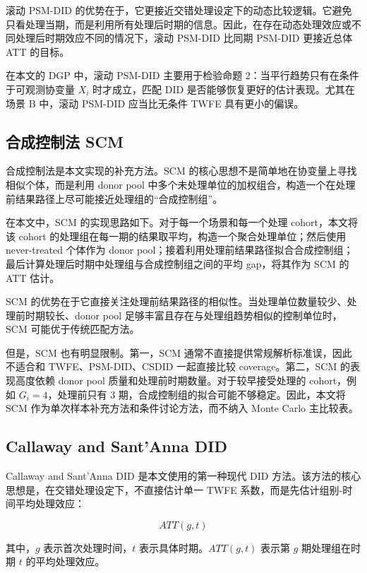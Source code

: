 \documentclass[
  fontset=windows]{ctexart}
\begin{document}
滚动 PSM-DID
的优势在于，它更接近交错处理设定下的动态比较逻辑。它避免只看处理当期，而是利用所有处理后时期的信息。因此，在存在动态处理效应或不同处理后时期效应不同的情况下，滚动
PSM-DID 比同期 PSM-DID 更接近总体 ATT 的目标。

在本文的 DGP 中，滚动 PSM-DID 主要用于检验命题
2：当平行趋势只有在条件于可观测协变量 \(X_i\) 时才成立，匹配 DID
是否能够恢复更好的估计表现。尤其在场景 B 中，滚动 PSM-DID 应当比无条件
TWFE 具有更小的偏误。

\subsection{合成控制法 SCM}\label{ux5408ux6210ux63a7ux5236ux6cd5-scm}

合成控制法是本文实现的补充方法。SCM
的核心思想不是简单地在协变量上寻找相似个体，而是利用 donor pool
中多个未处理单位的加权组合，构造一个在处理前结果路径上尽可能接近处理组的``合成控制组''。

在本文中，SCM 的实现思路如下。对于每一个场景和每一个处理
cohort，本文将该 cohort
的处理组在每一期的结果取平均，构造一个聚合处理单位；然后使用
never-treated 个体作为 donor
pool；接着利用处理前结果路径拟合合成控制组；最后计算处理后时期中处理组与合成控制组之间的平均
gap，将其作为 SCM 的 ATT 估计。

SCM
的优势在于它直接关注处理前结果路径的相似性。当处理单位数量较少、处理前时期较长、donor
pool 足够丰富且存在与处理组趋势相似的控制单位时，SCM
可能优于传统匹配方法。

但是，SCM 也有明显限制。第一，SCM
通常不直接提供常规解析标准误，因此不适合和 TWFE、PSM-DID、CSDID
一起直接比较 coverage。第二，SCM 的表现高度依赖 donor pool
质量和处理前时期数量。对于较早接受处理的 cohort，例如
\(G_i=4\)，处理前只有 3 期，合成控制组的拟合可能不够稳定。因此，本文将
SCM 作为单次样本补充方法和条件讨论方法，而不纳入 Monte Carlo 主比较表。

\subsection{Callaway and Sant'Anna DID}\label{callaway-and-santanna-did}

Callaway and Sant'Anna DID 是本文使用的第一种现代 DID
方法。该方法的核心思想是，在交错处理设定下，不直接估计单一 TWFE
系数，而是先估计组别-时间平均处理效应：

\[
ATT(g,t)
\]

其中，\(g\) 表示首次处理时间，\(t\) 表示具体时期。\(ATT(g,t)\) 表示第
\(g\) 期处理组在时期 \(t\) 的平均处理效应。
\end{document}
